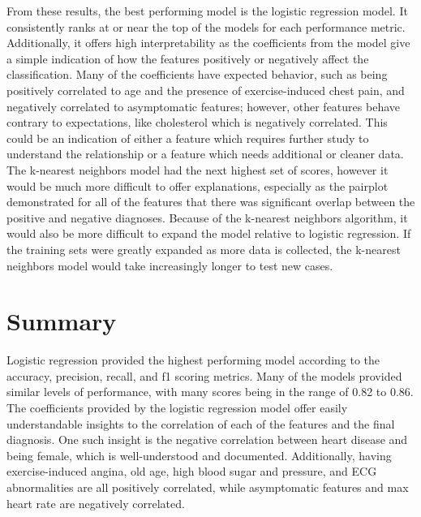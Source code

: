 \documentclass[12pt]{article}
\begin{document}

From these results, the best performing model is the logistic regression model. It 
consistently ranks at or near the top of the models for each performance metric. 
Additionally, it offers high interpretability as the coefficients from the model give a 
simple indication of how the features positively or negatively affect the classification. 
Many of the coefficients have expected behavior, such as being positively correlated to age 
and the presence of exercise-induced chest pain, and negatively correlated to asymptomatic 
features; however, other features behave contrary to expectations, like cholesterol which is
negatively correlated. This could be an indication of either a feature which requires 
further study to understand the relationship or a feature which needs additional or cleaner 
data. The k-nearest neighbors model had the next highest set of scores, however it would be 
much more difficult to offer explanations, especially as the pairplot demonstrated for all 
of the features that there was significant overlap between the positive and negative 
diagnoses. Because of the k-nearest neighbors algorithm, it would also be more difficult to 
expand the model relative to logistic regression. If the training sets were greatly expanded
as more data is collected, the k-nearest neighbors model would take increasingly longer to 
test new cases.

\section*{Summary}


Logistic regression provided the highest performing model according to the accuracy, 
precision, recall, and f1 scoring metrics. Many of the models provided similar levels of 
performance, with many scores being in the range of 0.82 to 0.86. The coefficients provided 
by the logistic regression model offer easily understandable insights to the correlation of 
each of the features and the final diagnosis. One such insight is the negative correlation 
between heart disease and being female, which is well-understood and documented. 
Additionally, having exercise-induced angina, old age, high blood sugar and pressure, and 
ECG abnormalities are all positively correlated, while asymptomatic features and max heart 
rate are negatively correlated. 
\end{document}
